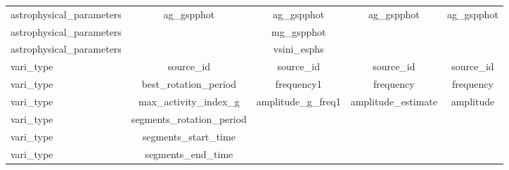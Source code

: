\begin{table}[H]
\begin{subtable}[h]{1.15\textwidth}
{\begin{tabular}{ccccc}
\multicolumn{1}{l|}{astrophysical\_parameters} &                ag\_gspphot                    &     ag\_gspphot                &                                ag\_gspphot           &        ag\_gspphot                                  \\

\multicolumn{1}{l|}{astrophysical\_parameters} &                                    & mg\_gspphot          &                             &                                                            \\
\multicolumn{1}{l|}{astrophysical\_parameters} &                                    & vsini\_esphs            &                             &                                                                  \\
\multicolumn{1}{l|}{vari\_type}                &                 source\_id                        &      source\_id                    &            source\_id                   &        source\_id                                                        \\
\multicolumn{1}{l|}{vari\_type }               & best\_rotation\_period             & frequency1             & frequency           & \multicolumn{1}{c}{frequency}                              \\
\multicolumn{1}{l|}{vari\_type}                & max\_activity\_index\_g            & amplitude\_g\_freq1    & amplitude\_estimate & amplitude                                           \\
\multicolumn{1}{l|}{vari\_type}                & segments\_rotation\_period &                        &                             &                                                                \\
\multicolumn{1}{l|}{vari\_type}                & segments\_start\_time &                        &                             &                                                                \\
\multicolumn{1}{l|}{vari\_type}                & segments\_end\_time &                        &                             &                                                                \\

\end{tabular}}
\end{subtable}
\end{table}
